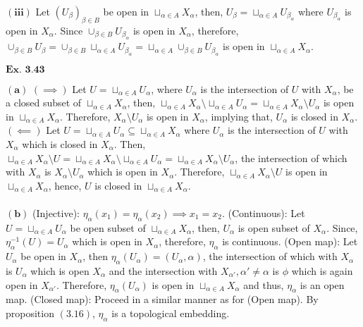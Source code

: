 \documentclass{article}
\begin{document}
$\mathbf{(iii)}$ Let $(U_\beta)_{\beta \in B}$ be open in $\sqcup_{\alpha \in A}X_{\alpha}$, then, $U_\beta = \sqcup_{\alpha \in A}U_{\beta_\alpha}$ where $U_{\beta_\alpha}$ is open in $X_{\alpha}$. Since $\cup_{\beta \in B}U_{\beta_\alpha}$ is open in $X_{\alpha}$, therefore, $\cup_{\beta \in B}U_\beta = \cup_{\beta \in B}\sqcup_{\alpha \in A}U_{\beta_\alpha} = \sqcup_{\alpha \in A}\cup_{\beta \in B}U_{\beta_\alpha}$ is open in $\sqcup_{\alpha \in A}X_{\alpha}$.

\vspace{0.2in}

${\textbf{Ex. 3.43}}$

$\mathbf{(a)}$ $(\implies)$ Let $U = \sqcup_{\alpha \in A}U_{\alpha}$, where $U_\alpha$ is the intersection of $U$ with $X_\alpha$, be a closed subset of $\sqcup_{\alpha \in A}X_{\alpha}$, then, $\sqcup_{\alpha \in A}X_{\alpha} \setminus \sqcup_{\alpha \in A}U_{\alpha} = \sqcup_{\alpha \in A}X_\alpha \setminus U_{\alpha}$ is open in $\sqcup_{\alpha \in A}X_{\alpha}$. Therefore, $X_\alpha \setminus U_\alpha$ is open in $X_\alpha$, implying that, $U_\alpha$ is closed in $X_\alpha$. $(\impliedby)$ Let $U = \sqcup_{\alpha \in A}U_{\alpha} \subseteq \sqcup_{\alpha \in A}X_{\alpha}$ where $U_\alpha$ is the intersection of $U$ with $X_\alpha$ which is closed in $X_\alpha$. Then, $\sqcup_{\alpha \in A}X_{\alpha} \setminus U = \sqcup_{\alpha \in A}X_{\alpha} \setminus \sqcup_{\alpha \in A}U_{\alpha} = \sqcup_{\alpha \in A}X_\alpha \setminus U_{\alpha}$, the intersection of which with $X_{\alpha}$ is $X_{\alpha}\setminus U_{\alpha}$ which is open in $X_{\alpha}$. Therefore, $\sqcup_{\alpha \in A}X_{\alpha} \setminus U$ is open in $\sqcup_{\alpha \in A}X_{\alpha}$, hence, $U$ is closed in $\sqcup_{\alpha \in A}X_{\alpha}$.\\~\\

$\mathbf{(b)}$ (Injective): $\eta_\alpha(x_1) = \eta_\alpha(x_2) \implies x_1 = x_2$. (Continuous): Let $U = \sqcup_{\alpha \in A}U_{\alpha}$ be open subset of $\sqcup_{\alpha \in A}X_{\alpha}$, then, $U_\alpha$ is open subset of $X_\alpha$. Since, $\eta_{\alpha}^{-1}(U) = U_\alpha$ which is open in $X_\alpha$, therefore, $\eta_\alpha$ is continuous. (Open map): Let $U_\alpha$ be open in $X_\alpha$, then $\eta_{\alpha}(U_\alpha) = (U_\alpha, \alpha)$, the intersection of which with $X_\alpha$ is $U_\alpha$ which is open $X_\alpha$ and the intersection with $X_{\alpha'}, \alpha' \neq \alpha$ is $\phi$ which is again open in $X_{\alpha'}$. Therefore, $\eta_{\alpha}(U_\alpha)$ is open in $\sqcup_{\alpha \in A}X_{\alpha}$ and thus, $\eta_\alpha$ is an open map. (Closed map): Proceed in a similar manner as for (Open map). By proposition $\mathbf{(3.16)}$, $\eta_\alpha$ is a topological embedding.\\~\\
\end{document}
